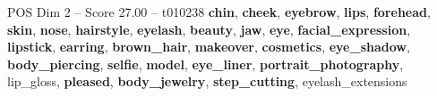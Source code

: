 \begin{textsample}{POS Dim 2 – Score 27.00 – t010238}  \label{ex:f2_pos_006}
\textbf{chin}, \textbf{cheek}, \textbf{eyebrow}, \textbf{lips}, \textbf{forehead}, \textbf{skin}, \textbf{nose}, \textbf{hairstyle}, \textbf{eyelash}, \textbf{beauty}, \textbf{jaw}, \textbf{eye}, \textbf{facial\_expression}, \textbf{lipstick}, \textbf{earring}, \textbf{brown\_hair}, \textbf{makeover}, \textbf{cosmetics}, \textbf{eye\_shadow}, \textbf{body\_piercing}, \textbf{selfie}, \textbf{model}, \textbf{eye\_liner}, \textbf{portrait\_photography}, lip\_gloss, \textbf{pleased}, \textbf{body\_jewelry}, \textbf{step\_cutting}, eyelash\_extensions

\end{textsample}
